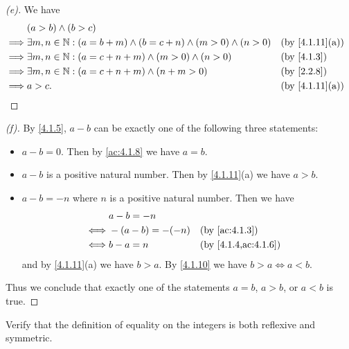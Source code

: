 \begin{proof}[(e)]
  We have
  \begin{align*}
             & (a > b) \land (b > c)                                                                               \\
    \implies & \exists m, n \in \N : (a = b + m) \land (b = c + n) \land (m > 0) \land (n > 0) &  & \by{4.1.11}[a] \\
    \implies & \exists m, n \in \N : (a = c + n + m) \land (m > 0) \land (n > 0)               &  & \by{4.1.3}     \\
    \implies & \exists m, n \in \N : (a = c + n + m) \land (n + m > 0)                         &  & \by{2.2.8}     \\
    \implies & a > c.                                                                          &  & \by{4.1.11}[a]
  \end{align*}
\end{proof}

\begin{proof}[(f)]
  By \cref{4.1.5}, \(a - b\) can be exactly one of the following three statements:
  \begin{itemize}
    \item \(a - b = 0\).
          Then by \cref{ac:4.1.8} we have \(a = b\).
    \item \(a - b\) is a positive natural number.
          Then by \cref{4.1.11}(a) we have \(a > b\).
    \item \(a - b = -n\) where \(n\) is a positive natural number.
          Then we have
          \begin{align*}
                 & a - b = -n                                \\
            \iff & -(a - b) = -(-n) &  & \by{ac:4.1.3}       \\
            \iff & b - a = n        &  & \by{4.1.4,ac:4.1.6}
          \end{align*}
          and by \cref{4.1.11}(a) we have \(b > a\).
          By \cref{4.1.10} we have \(b > a \iff a < b\).
  \end{itemize}
  Thus we conclude that exactly one of the statements \(a = b\), \(a > b\), or \(a < b\) is true.
\end{proof}

\exercisesection

\begin{ex}\label{ex:4.1.1}
  Verify that the definition of equality on the integers is both reflexive and symmetric.
\end{ex}

